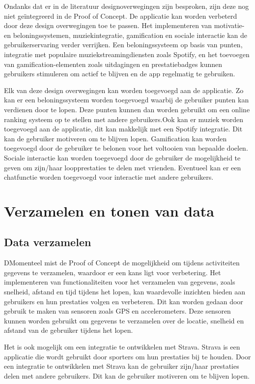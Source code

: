 Ondanks dat er in de literatuur designoverwegingen zijn besproken, zijn deze nog niet geïntegreerd in de Proof of Concept. De applicatie kan worden verbeterd door deze design overwegingen toe te passen. Het implementeren van motivatie- en beloningssystemen, muziekintegratie, gamification en sociale interactie kan de gebruikerservaring verder verrijken. Een beloningssysteem op basis van punten, integratie met populaire muziekstreamingdiensten zoals Spotify, en het toevoegen van gamification-elementen zoals uitdagingen en prestatiebadges kunnen gebruikers stimuleren om actief te blijven en de app regelmatig te gebruiken.

Elk van deze design overwegingen kan worden toegevoegd aan de applicatie. Zo kan er een beloningssysteem worden toegevoegd waarbij de gebruiker punten kan verdienen door te lopen. Deze punten kunnen dan worden gebruikt om een online ranking systeem op te stellen met andere gebruikers.Ook kan er muziek worden toegevoegd aan de applicatie, dit kan makkelijk met een Spotify integratie. Dit kan de gebruiker motiveren om te blijven lopen. Gamification kan worden toegevoegd door de gebruiker te belonen voor het voltooien van bepaalde doelen. Sociale interactie kan worden toegevoegd door de gebruiker de mogelijkheid te geven om zijn/haar loopprestaties te delen met vrienden. Eventueel kan er een chatfunctie worden toegevoegd voor interactie met andere gebruikers.

\section{Verzamelen en tonen van data}

\subsection{Data verzamelen}

DMomenteel mist de Proof of Concept de mogelijkheid om tijdens activiteiten gegevens te verzamelen, waardoor er een kans ligt voor verbetering. Het implementeren van functionaliteiten voor het verzamelen van gegevens, zoals snelheid, afstand en tijd tijdens het lopen, kan waardevolle inzichten bieden aan gebruikers en hun prestaties volgen en verbeteren. Dit kan worden gedaan door gebruik te maken van sensoren zoals GPS en accelerometers. Deze sensoren kunnen worden gebruikt om gegevens te verzamelen over de locatie, snelheid en afstand van de gebruiker tijdens het lopen.

Het is ook mogelijk om een integratie te ontwikkelen met Strava. Strava is een applicatie die wordt gebruikt door sporters om hun prestaties bij te houden. Door een integratie te ontwikkelen met Strava kan de gebruiker zijn/haar prestaties delen met andere gebruikers. Dit kan de gebruiker motiveren om te blijven lopen.

